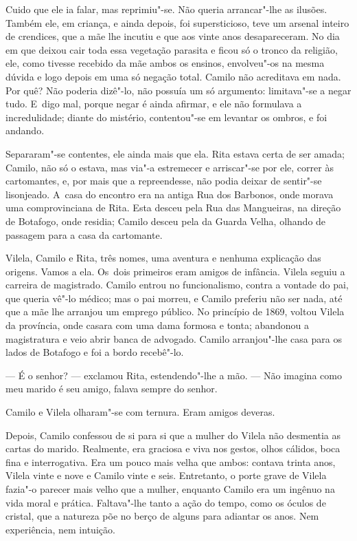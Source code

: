 \begin{linenumbers}
Cuido que ele ia falar, mas reprimiu"-se. Não queria arrancar"-lhe as
ilusões. Também ele, em criança, e ainda depois, foi supersticioso, teve
um arsenal inteiro de crendices, que a mãe lhe incutiu e que aos vinte
anos desapareceram. No dia em que deixou cair toda essa vegetação
parasita e ficou só o tronco da religião, ele, como tivesse recebido da
mãe ambos os ensinos, envolveu"-os na mesma dúvida e logo depois em uma
só negação total. Camilo não acreditava em nada. Por quê? Não poderia
dizê"-lo, não possuía um só argumento: limitava"-se a negar tudo. E~digo
mal, porque negar é ainda afirmar, e ele não formulava a incredulidade;
diante do mistério, contentou"-se em levantar os ombros, e foi andando.

Separaram"-se contentes, ele ainda mais que ela. Rita estava certa de ser
amada; Camilo, não só o estava, mas via"-a estremecer e arriscar"-se por
ele, correr às cartomantes, e, por mais que a repreendesse, não podia
deixar de sentir"-se lisonjeado. A~casa do encontro era na antiga Rua dos
Barbonos, onde morava uma comprovinciana de Rita. Esta desceu pela Rua
das Mangueiras, na direção de Botafogo, onde residia; Camilo desceu pela
da Guarda Velha, olhando de passagem para a casa da cartomante.

Vilela, Camilo e Rita, três nomes, uma aventura e nenhuma explicação das
origens. Vamos a ela. Os~dois primeiros eram amigos de infância. Vilela
seguiu a carreira de magistrado. Camilo entrou no funcionalismo, contra
a vontade do pai, que queria vê"-lo médico; mas o pai morreu, e Camilo
preferiu não ser nada, até que a mãe lhe arranjou um emprego público. No
princípio de 1869, voltou Vilela da província, onde casara com uma dama
formosa e tonta; abandonou a magistratura e veio abrir banca de
advogado. Camilo arranjou"-lhe casa para os lados de Botafogo e foi a
bordo recebê"-lo.

--- É o senhor? --- exclamou Rita, estendendo"-lhe a mão. --- Não imagina
como meu marido é seu amigo, falava sempre do senhor.

Camilo e Vilela olharam"-se com ternura. Eram amigos deveras.

Depois, Camilo confessou de si para si que a mulher do Vilela não
desmentia as cartas do marido. Realmente, era graciosa e viva nos
gestos, olhos cálidos, boca fina e interrogativa. Era um pouco mais
velha que ambos: contava trinta anos, Vilela vinte e nove e Camilo vinte
e seis. Entretanto, o porte grave de Vilela fazia"-o parecer mais velho
que a mulher, enquanto Camilo era um ingênuo na vida moral e prática.
Faltava"-lhe tanto a ação do tempo, como os óculos de cristal, que a
natureza põe no berço de alguns para adiantar os anos. Nem experiência,
nem intuição.


\end{linenumbers}
